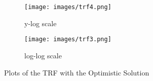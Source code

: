 \begin{figure}
\begin{subfigure}{.5\textwidth}
  \centering
  \texttt{[image: images/trf4.png]}
  \caption{y-log scale}
  \label{fig:sfig1}
\end{subfigure}%
\begin{subfigure}{.5\textwidth}
  \centering
  \texttt{[image: images/trf3.png]}
  \caption{log-log scale}
  \label{fig:sfig2}
\end{subfigure}
\caption{Plots of the TRF with the Optimistic Solution}
\label{fig:fig}
\end{figure}

\clearpage